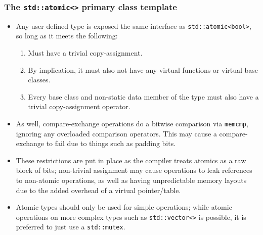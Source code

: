 \documentclass[11pt, a4paper]{article}
\theoremstyle{definition}
\theoremstyle{remark}
\newcommand{\code}[1]{\lstinline|#1|}
\begin{document}
\subsubsection{The \texorpdfstring{\code{std::atomic<>}}{std::atomic<>} primary class template}
\begin {itemize}
    \item Any user defined type is exposed the same interface as \code{std::atomic<bool>}, so long as it meets the following:
    \begin {enumerate}
        \item Must have a trivial copy-assignment.
        \item By implication, it must also not have any virtual functions or virtual base classes.
        \item Every base class and non-static data member of the type must also have a trivial copy-assignment operator.
    \end {enumerate}
    \item As well, compare-exchange operations do a bitwise comparison via \code{memcmp}, ignoring any overloaded comparison operators. This may cause a compare-exchange to fail due to things such as padding bits.
    \item These restrictions are put in place as the compiler treats atomics as a raw block of bits; non-trivial assignment may cause operations to leak references to non-atomic operations, as well as having unpredictable memory layouts due to the added overhead of a virtual pointer/table.
    \item Atomic types should only be used for simple operations; while atomic operations on more complex types such as \code{std::vector<>} is possible, it is preferred to just use a \code{std::mutex}.
\end {itemize}
\end{document}

